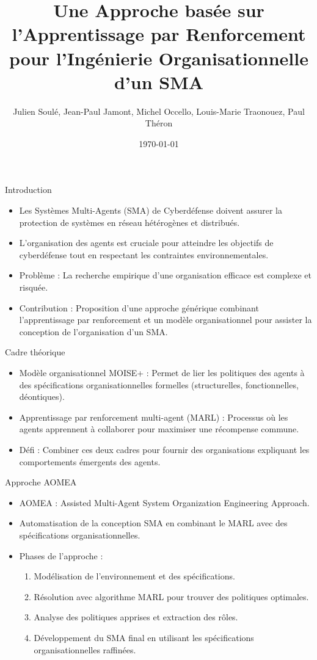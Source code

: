 \documentclass{beamer}
\title{Une Approche basée sur l’Apprentissage par Renforcement pour l’Ingénierie Organisationnelle d’un SMA}
\author{Julien Soulé, Jean-Paul Jamont, Michel Occello, Louis-Marie Traonouez, Paul Théron}
\date{\today}
\begin{document}
\begin{frame}
  \titlepage
\end{frame}

\begin{frame}{Introduction}
    \begin{itemize}
        \item Les Systèmes Multi-Agents (SMA) de Cyberdéfense doivent assurer la protection de systèmes en réseau hétérogènes et distribués.
        \item L'organisation des agents est cruciale pour atteindre les objectifs de cyberdéfense tout en respectant les contraintes environnementales.
        \item Problème : La recherche empirique d'une organisation efficace est complexe et risquée.
        \item Contribution : Proposition d'une approche générique combinant l'apprentissage par renforcement et un modèle organisationnel pour assister la conception de l'organisation d'un SMA.
    \end{itemize}
\end{frame}

\begin{frame}{Cadre théorique}
    \begin{itemize}
        \item Modèle organisationnel MOISE+ : Permet de lier les politiques des agents à des spécifications organisationnelles formelles (structurelles, fonctionnelles, déontiques).
        \item Apprentissage par renforcement multi-agent (MARL) : Processus où les agents apprennent à collaborer pour maximiser une récompense commune.
        \item Défi : Combiner ces deux cadres pour fournir des organisations expliquant les comportements émergents des agents.
    \end{itemize}
\end{frame}

\begin{frame}{Approche AOMEA}
    \begin{itemize}
        \item AOMEA : Assisted Multi-Agent System Organization Engineering Approach.
        \item Automatisation de la conception SMA en combinant le MARL avec des spécifications organisationnelles.
        \item Phases de l'approche : 
        \begin{enumerate}
            \item Modélisation de l'environnement et des spécifications.
            \item Résolution avec algorithme MARL pour trouver des politiques optimales.
            \item Analyse des politiques apprises et extraction des rôles.
            \item Développement du SMA final en utilisant les spécifications organisationnelles raffinées.
        \end{enumerate}
    \end{itemize}
\end{frame}
\end{document}
